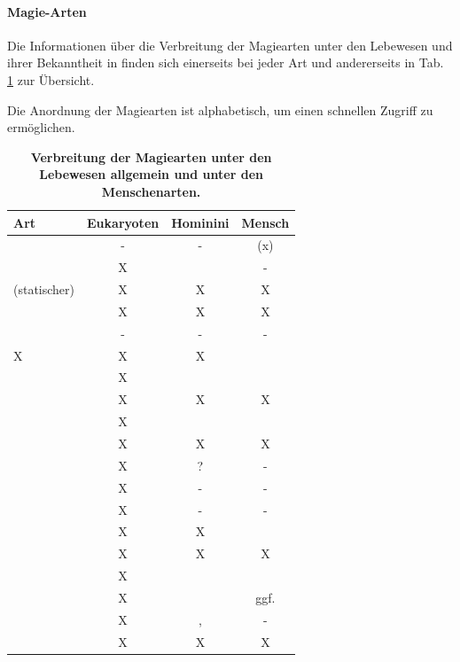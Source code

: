 \paragraph{Magie-Arten}
Die Informationen über die Verbreitung der Magiearten unter den Lebewesen und ihrer Bekanntheit in  finden sich einerseits bei jeder Art und andererseits in Tab. \ref{tab:magie-verbreitung} zur Übersicht.

Die Anordnung der Magiearten ist alphabetisch, um einen schnellen Zugriff zu ermöglichen.

\begin{table}[htb]
	\centering
	\caption{\textbf{Verbreitung der Magiearten unter den Lebewesen allgemein und unter den Menschenarten.}}
	\label{tab:magie-verbreitung}
	\begin{threeparttable}[\linewidth]
		\begin{tabularx}{\textwidth}{l|ccc}
			\toprule
			\textbf{Art} & \textbf{Eukaryoten} & \textbf{Hominini} & \textbf{Mensch} \\
		    \midrule
			\nameref{magie:absorption}  & - & - & (x)  \\
			\nameref{magie:bindung} & X & \nameref{rasse:sylvan} & -  \\
			(statischer) \nameref{magie:druck} & X & X & X  \\
			\nameref{magie:gleichstrom}  & X & X & X  \\
			\nameref{magie:gravitation} & - & - & - \\ \midrule[0.1px]
			\nameref{magie:hydrodynamik} X & X & X &\\
			\nameref{magie:infrarot} & X & & \\
			\nameref{magie:licht}  & X & X & X  \\
			\nameref{magie:mikrowelle} & X & &\\
			\nameref{magie:proliferation} & X & X & X \\ \midrule[0.1px]
			\nameref{magie:quantenmechanik} & X & ? & - \\
			\nameref{magie:roentgen} & X & - & - \\
			\nameref{magie:rundfunk} & X & - & - \\
			\nameref{magie:schub} & X & X & \\
			\nameref{magie:temperatur} & X & X & X  \\ \midrule[0.1px]
			\nameref{magie:terahertz} & X & & \\
			\nameref{magie:uv} & X & \nameref{rasse:ferus} & ggf. \\
			\nameref{magie:vibration} & X & \nameref{rasse:zwerg}, \nameref{rasse:unda} & -  \\
			\nameref{magie:wechselstrom} & X & X & X \\
			\bottomrule
		\end{tabularx}
	\end{threeparttable}
\end{table}



